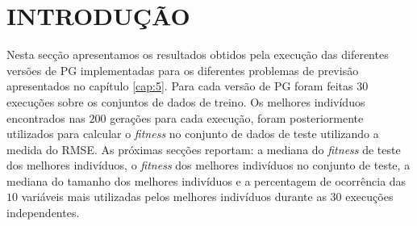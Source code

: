 \section{INTRODUÇÃO}
\label{sec:6introducao}

Nesta secção apresentamos os resultados obtidos pela execução das diferentes versões de \ac{PG} implementadas 
para os diferentes problemas de previsão apresentados no capítulo \ref{cap:5}. Para cada versão de \ac{PG} foram feitas $30$
execuções sobre os conjuntos de dados de treino. Os melhores indivíduos encontrados nas $200$ gerações para cada execução,
foram posteriormente utilizados para calcular o 
\emph{fitness} no conjunto de dados de teste utilizando a medida do \ac{RMSE}. 
As próximas secções reportam: a mediana do \emph{fitness} de teste dos melhores indivíduos, o \emph{fitness} dos melhores
indivíduos no conjunto de teste, a mediana do tamanho dos melhores indivíduos e a percentagem de ocorrência das $10$ variáveis mais utilizadas pelos 
melhores indivíduos durante as $30$ execuções independentes.